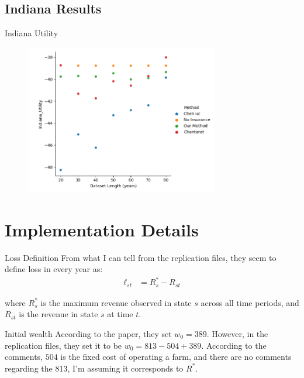 \documentclass{beamer}
\begin{document}
\subsection*{Indiana Results}
\begin{frame}{Indiana Utility}
    \begin{figure}
        \includegraphics[width=0.75\textwidth]{../../../output/figures/Midwest Evaluation/Indiana_Utility_Length.png}
    \end{figure}
\end{frame}


\section*{Implementation Details}
\begin{frame}{Loss Definition}
    From what I can tell from the replication files, they seem to define loss in every year as: 
    \begin{align*}
        \ell_{st} &= R^*_s - R_{st}
    \end{align*}

    where $R^*_s$ is the maximum revenue observed in state $s$ across all time periods, and $R_{st}$ is the revenue in state $s$ at time $t$. 
\end{frame}

\begin{frame}{Initial wealth}
    According to the paper, they set $w_0 = 389$. However, in the replication files, they set it to be $w_0 = 813 - 504 + 389$. According to the comments, $504$ is the fixed cost of operating a farm, and there are no comments regarding the $813$, I'm assuming it corresponds to $R^*$. 
\end{frame}
\end{document}
